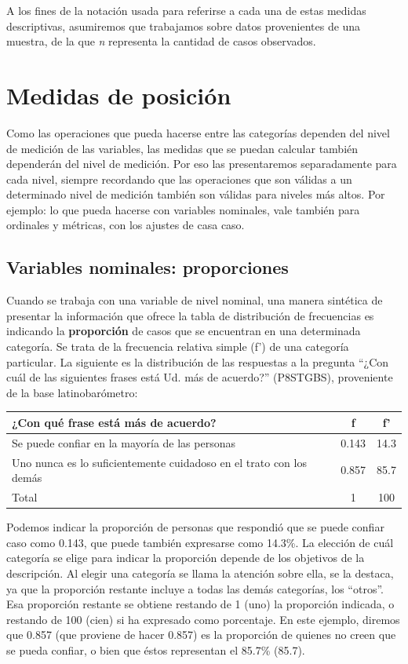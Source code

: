 \documentclass[]{book}
\begin{document}
A los fines de la notación usada para referirse a cada una de estas
medidas descriptivas, asumiremos que trabajamos sobre datos provenientes de una muestra, de la que \emph{n} representa la cantidad de casos observados.

\hypertarget{medidas-de-posicion}{%
\section{Medidas de posición}\label{medidas-de-posicion}}

Como las operaciones que pueda hacerse entre las categorías dependen del nivel de medición de las variables, las medidas que se puedan calcular también dependerán del nivel de medición. Por eso las presentaremos separadamente para cada nivel, siempre recordando que las operaciones que son válidas a un determinado nivel de medición también son válidas para niveles más altos. Por ejemplo: lo que pueda hacerse con variables nominales, vale también para ordinales y métricas, con los ajustes de casa caso.

\hypertarget{variables-nominales-proporciones}{%
\subsection{Variables nominales: proporciones}\label{variables-nominales-proporciones}}

Cuando se trabaja con una variable de nivel nominal, una manera
sintética de presentar la información que ofrece la tabla de
distribución de frecuencias es indicando la \textbf{proporción} de casos que se encuentran en una determinada categoría. Se trata de la frecuencia relativa simple (f') de una categoría particular. La siguiente es la distribución de las respuestas a la pregunta ``¿Con cuál de las siguientes frases está Ud. más de acuerdo?'' (P8STGBS), proveniente de la base latinobarómetro:

\begin{longtable}[]{@{}lcc@{}}
\toprule
¿Con qué frase está más de acuerdo? & f & f'\tabularnewline
\midrule
\endhead
Se puede confiar en la mayoría de las personas & 0.143 & 14.3\tabularnewline
Uno nunca es lo suficientemente cuidadoso en el trato con los demás & 0.857 & 85.7\tabularnewline
Total & 1 & 100\tabularnewline
\bottomrule
\end{longtable}

Podemos indicar la proporción de personas que respondió que se puede confiar caso como 0.143, que puede también expresarse como 14.3\%. La elección de cuál categoría se elige para indicar la proporción depende de los objetivos de la descripción. Al elegir una categoría se llama la atención sobre ella, se la destaca, ya que la proporción restante incluye a todas las demás categorías, los ``otros''. Esa proporción restante se obtiene restando de 1 (uno) la proporción indicada, o restando de 100 (cien) si ha expresado como porcentaje. En este ejemplo, diremos que 0.857 (que proviene de hacer 0.857) es la proporción de quienes no creen que se pueda confiar, o bien que éstos representan el 85.7\% (85.7).
\end{document}
